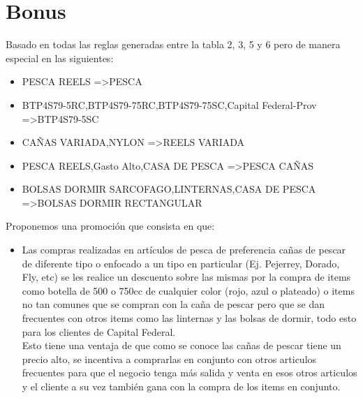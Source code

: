 \documentclass[]{article}
\begin{document}
	\section{Bonus}
	Basado en todas las reglas generadas entre la tabla 2, 3, 5 y 6 pero de manera especial en las siguientes:\\
	\begin{itemize}
		\item PESCA REELS =\textgreater PESCA
		\item BTP4S79-5RC,BTP4S79-75RC,BTP4S79-75SC,Capital Federal-Prov =\textgreater BTP4S79-5SC
		\item CAÑAS VARIADA,NYLON =\textgreater REELS VARIADA
		\item PESCA REELS,Gasto Alto,CASA DE PESCA =\textgreater PESCA CAÑAS
		\item BOLSAS DORMIR SARCOFAGO,LINTERNAS,CASA DE PESCA =\textgreater BOLSAS DORMIR RECTANGULAR
	\end{itemize}
	 Proponemos una promoción que consista en que: 
	\begin{itemize}
		\item Las compras realizadas en artículos de pesca de preferencia cañas de pescar de diferente tipo o enfocado a un tipo en particular (Ej. Pejerrey, Dorado, Fly, etc)  se les realice un descuento sobre las mismas por la compra de items como botella de 500 o 750cc de cualquier color (rojo, azul o plateado) o items no tan comunes que se compran con la caña de pescar pero que se dan frecuentes con otros items como las linternas y las bolsas de dormir, todo esto para los clientes de Capital Federal.\\
		
		Esto tiene una ventaja de que como se conoce las cañas de pescar tiene un precio alto, se incentiva a comprarlas en conjunto con otros articulos frecuentes para que el negocio tenga más salida y venta en esos otros articulos y el cliente a su vez también gana con la compra de los items en conjunto.\\
	\end{itemize}
\end{document}
